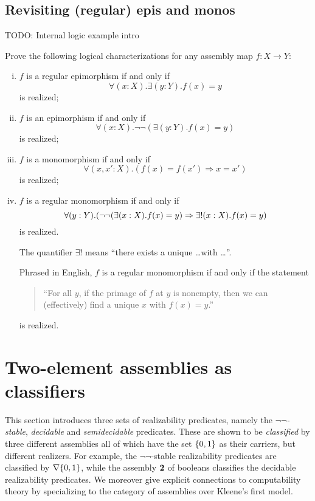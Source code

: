 \subsection{Revisiting (regular) epis and monos}
\textcolor{Mulberry}{TODO: Internal logic example intro}
\begin{exercise}\label{exer:epis-monos-logically}
  Prove the following logical characterizations for any assembly map \(f \colon X \to Y\):
  \begin{enumerate}[(i)]
  \item \(f\) is a regular epimorphism if and only if
    \[
      \forall(x : X).\exists(y : Y).f(x) = y
    \]
    is realized;
  \item \(f\) is an epimorphism if and only if
    \[
      \forall(x : X).\lnot\lnot({\exists(y : Y).f(x) = y})
    \]
    is realized;
  \item \(f\) is a monomorphism if and only if
    \[
      \forall(x, x' : X).(f(x) = f(x') \Rightarrow x = x')
    \]
    is realized;
  \item \(f\) is a regular monomorphism if and only if
    \[
      \forall(y : Y).\pa*{\lnot\lnot\pa*{\exists(x : X).f(x) = y} \Rightarrow \exists!(x : X).f(x) = y}
    \]
    is realized.

    The quantifier \(\exists!\) means ``there exists a unique \dots with \dots''.

    Phrased in English, \(f\) is a regular monomorphism if and only if the statement
    \begin{quote}{``For all \(y\), if the primage of \(f\) at \(y\) is nonempty,
        then we can (effectively) find a unique \(x\) with \(f(x) = y\).''}
    \end{quote}
    is realized.
  \end{enumerate}
\end{exercise}


\section{Two-element assemblies as classifiers}

This section introduces three sets of realizability predicates, namely the
\emph{\(\lnot\lnot\)-stable}, \emph{decidable} and \emph{semidecidable}
predicates.
%
These are shown to be \emph{classified} by three different assemblies all of
which have the set \(\{0,1\}\) as their carriers, but different realizers.
%
For example, the \(\lnot\lnot\)-stable realizability predicates are classified
by \(\nabla\{0,1\}\), while the assembly \(\mathbf 2\) of booleans classifies the
decidable realizability predicates.
%
We moreover give explicit connections to computability theory by specializing to
the category of assemblies over Kleene's first model.

